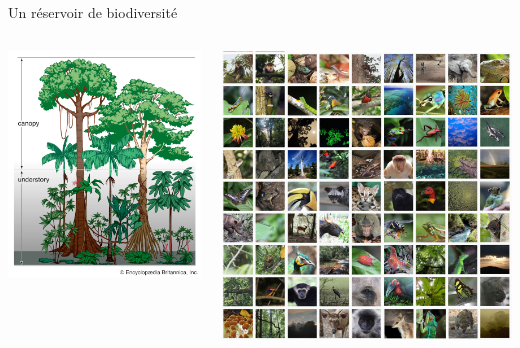 \documentclass[10pt,table,dvipsnames,compress]{beamer}
\begin{document}
\begin{frame}[label={sec:org8633800}]{Un réservoir de biodiversité}
\begin{columns}
\begin{column}{0.5\columnwidth}
\begin{center}
\includegraphics[width=\textwidth]{figs/vegetation-profile-rainforest.png}
\end{center}
\end{column}
\begin{column}{0.5\columnwidth}
\begin{center}
\includegraphics[width=\textwidth]{figs/biodiversity-in-tropical-forests.jpg}

\end{center}
\end{column}
\end{columns}
\end{frame}
\end{document}
